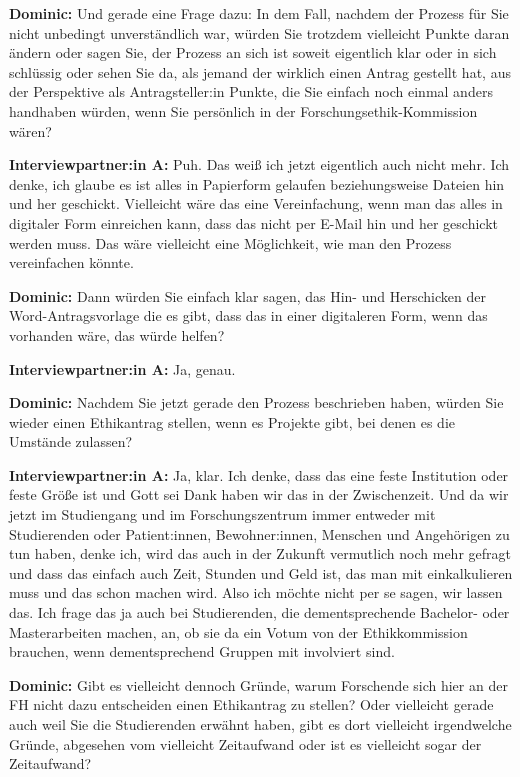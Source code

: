 \documentclass[a4paper,12pt,twoside,numbers=noendperiod]{scrreprt}
\begin{document}
\textbf{Dominic:} Und gerade eine Frage dazu: In dem Fall, nachdem der Prozess für Sie nicht unbedingt unverständlich war, würden Sie trotzdem vielleicht Punkte daran ändern oder sagen Sie, der Prozess an sich ist soweit eigentlich klar oder in sich schlüssig oder sehen Sie da, als jemand der wirklich einen Antrag gestellt hat, aus der Perspektive als Antragsteller:in Punkte, die Sie einfach noch einmal anders handhaben würden, wenn Sie persönlich in der Forschungsethik-Kommission wären?

\textbf{Interviewpartner:in A:} Puh. Das weiß ich jetzt eigentlich auch nicht mehr. Ich denke, ich glaube es ist alles in Papierform gelaufen beziehungsweise Dateien hin und her geschickt. Vielleicht wäre das eine Vereinfachung, wenn man das alles in digitaler Form einreichen kann, dass das nicht per E-Mail hin und her geschickt werden muss. Das wäre vielleicht eine Möglichkeit, wie man den Prozess vereinfachen könnte.

\textbf{Dominic:} Dann würden Sie einfach klar sagen, das Hin- und Herschicken der Word-Antragsvorlage die es gibt, dass das in einer digitaleren Form, wenn das vorhanden wäre, das würde helfen?

\textbf{Interviewpartner:in A:} Ja, genau.

\textbf{Dominic:} Nachdem Sie jetzt gerade den Prozess beschrieben haben, würden Sie wieder einen Ethikantrag stellen, wenn es Projekte gibt, bei denen es die Umstände zulassen?

\textbf{Interviewpartner:in A:} Ja, klar. Ich denke, dass das eine feste Institution oder feste Größe ist und Gott sei Dank haben wir das in der Zwischenzeit. Und da wir jetzt im Studiengang und im Forschungszentrum immer entweder mit Studierenden oder Patient:innen, Bewohner:innen, Menschen und Angehörigen zu tun haben, denke ich, wird das auch in der Zukunft vermutlich noch mehr gefragt und dass das einfach auch Zeit, Stunden und Geld ist, das man mit einkalkulieren muss und das schon machen wird. Also ich möchte nicht per se sagen, wir lassen das. Ich frage das ja auch bei Studierenden, die dementsprechende Bachelor- oder Masterarbeiten machen, an, ob sie da ein Votum von der Ethikkommission brauchen, wenn dementsprechend Gruppen mit involviert sind.

\textbf{Dominic:} Gibt es vielleicht dennoch Gründe, warum Forschende sich hier an der FH nicht dazu entscheiden einen Ethikantrag zu stellen? Oder vielleicht gerade auch weil Sie die Studierenden erwähnt haben, gibt es dort vielleicht irgendwelche Gründe, abgesehen vom vielleicht Zeitaufwand oder ist es vielleicht sogar der Zeitaufwand?
\end{document}
